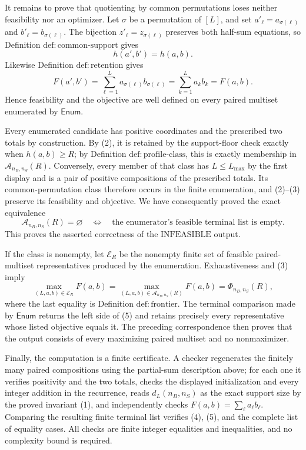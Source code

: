 It remains to prove that quotienting by common permutations loses neither feasibility nor an optimizer.  Let \(\sigma\) be a permutation of \([L]\), and set \(a'_\ell=a_{\sigma(\ell)}\) and \(b'_\ell=b_{\sigma(\ell)}\).  The bijection \(z'_{\ell}=z_{\sigma(\ell)}\) preserves both half-sum equations, so Definition \(\mathrm{def{:}common\text{-}support}\) gives
\[
  h(a',b')=h(a,b).
\]
Likewise Definition \(\mathrm{def{:}retention}\) gives
\[
  F(a',b')=\sum_{\ell=1}^{L}a_{\sigma(\ell)}b_{\sigma(\ell)}
           =\sum_{k=1}^{L}a_kb_k=F(a,b).                         \tag{3}
\]
Hence feasibility and the objective are well defined on every paired multiset enumerated by \(\mathsf{Enum}\).

Every enumerated candidate has positive coordinates and the prescribed two totals by construction.  By (2), it is retained by the support-floor check exactly when \(h(a,b)\ge R\); by Definition \(\mathrm{def{:}profile\text{-}class}\), this is exactly membership in \(\mathcal A_{n_B,n_S}(R)\).  Conversely, every member of that class has \(L\le L_{\max}\) by the first display and is a pair of positive compositions of the prescribed totals.  Its common-permutation class therefore occurs in the finite enumeration, and (2)--(3) preserve its feasibility and objective.  We have consequently proved the exact equivalence
\[
 \mathcal A_{n_B,n_S}(R)=\varnothing
 \quad\Longleftrightarrow\quad
 \text{the enumerator's feasible terminal list is empty}.       \tag{4}
\]
This proves the asserted correctness of the \(\mathrm{INFEASIBLE}\) output.

If the class is nonempty, let \(\mathscr E_R\) be the nonempty finite set of feasible paired-multiset representatives produced by the enumeration.  Exhaustiveness and (3) imply
\[
 \max_{(L,a,b)\in\mathscr E_R}F(a,b)
 =\max_{(L,a,b)\in\mathcal A_{n_B,n_S}(R)}F(a,b)
 =\Phi_{n_B,n_S}(R),                                             \tag{5}
\]
where the last equality is Definition \(\mathrm{def{:}frontier}\).  The terminal comparison made by \(\mathsf{Enum}\) returns the left side of (5) and retains precisely every representative whose listed objective equals it.  The preceding correspondence then proves that the output consists of every maximizing paired multiset and no nonmaximizer.

Finally, the computation is a finite certificate.  A checker regenerates the finitely many paired compositions using the partial-sum description above; for each one it verifies positivity and the two totals, checks the displayed initialization and every integer addition in the recurrence, reads \(d_L(n_B,n_S)\) as the exact support size by the proved invariant (1), and independently checks \(F(a,b)=\sum_\ell a_\ell b_\ell\).  Comparing the resulting finite terminal list verifies (4), (5), and the complete list of equality cases.  All checks are finite integer equalities and inequalities, and no complexity bound is required.

